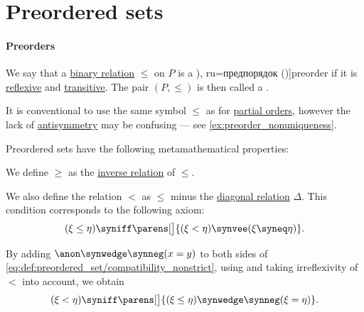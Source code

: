 \section{Preordered sets}\label{sec:preordered_sets}

\paragraph{Preorders}

\begin{definition}\label{def:preordered_set}
  We say that a \hyperref[def:binary_relation]{binary relation} \( \leq \) on \( P \) is a \term[bg=преднаредба (\cite[9]{Проданов1982ФункционаленАнализЧаст1}), ru=предпорядок (\cite[def 3.1]{Гуров2013ТеорияРешёток})]{preorder} if it is \hyperref[def:binary_relation/reflexive]{reflexive} and \hyperref[def:binary_relation/transitive]{transitive}. The pair \( (P, \leq) \) is then called a .

  It is conventional to use the same symbol \( \leq \) as for \hyperref[def:partially_ordered_set]{partial orders}, however the lack of \hyperref[def:binary_relation/antisymmetric]{antisymmetry} may be confusing --- see \cref{ex:preorder_nonuniqueness}.

  Preordered sets have the following metamathematical properties:
  \begin{thmenum}[series=def:preordered_set]
     We define \( \geq \) as the \hyperref[def:binary_relation/converse]{inverse relation} of \( \leq \).

     We also define the relation \( < \) as \( \leq \) minus the \hyperref[def:binary_relation/diagonal]{diagonal relation} \( \Delta \). This condition corresponds to the following axiom:
    \begin{equation}\label{eq:def:preordered_set/compatibility_nonstrict}
      (\xi \leq \eta) \syniff \parens[\big]{(\xi < \eta) \synvee (\xi \syneq \eta)}.
    \end{equation}

    By adding \( \anon \synwedge \synneg (x = y) \) to both sides of \eqref{eq:def:preordered_set/compatibility_nonstrict}, using  and taking irreflexivity of \( < \) into account, we obtain
    \begin{equation}\label{eq:def:preordered_set/compatibility_strict}
      (\xi < \eta) \syniff \parens[\big]{(\xi \leq \eta) \synwedge \synneg (\xi = \eta)}.
    \end{equation}


\end{thmenum}
\end{definition}
